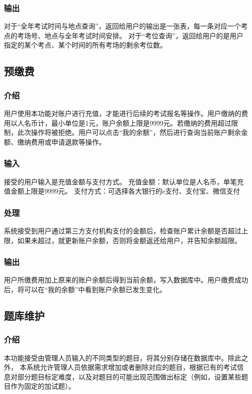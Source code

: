 \subsubsection{输出}
对于“全年考试时间与地点查询”，返回给用户的输出是一张表，每一条对应一个考点的考场号、地点与全年考试时间安排。
对于“考位查询”，返回给用户的是用户指定的某个考点、某个时间的所有考场的剩余考位数。

\subsection{预缴费}

\subsubsection{介绍}
用户使用本功能对账户进行充值，才能进行后续的考试报名等操作。用户缴纳的费用以人名币计，最小单位是1元，账户余额上限是9999元。若缴纳的费用超过限制，此次操作将被拒绝。用户可以点击“我的余额”，然后进行查询当前账户剩余金额、缴纳费用或申请退款等操作。

\subsubsection{输入}
接受的用户输入是充值金额与支付方式。
充值金额：默认单位是人名币，单笔充值金额上限是9999元。
支付方式：可选择各大银行的e支付、支付宝、微信支付

\subsubsection{处理}
系统接受到用户通过第三方支付机构支付的金额后，检查账户累计余额是否超过上限，如果未超过，就更新账户余额，否则将金额返还给用户，并告知余额超限。

\subsubsection{输出}
用户所缴费用加上原来的账户余额后得到当前余额，写入数据库中。用户缴费成功后，将可以在“我的余额”中看到账户余额已发生变化。


\subsection{题库维护}

\subsubsection{介绍}
本功能接受由管理人员输入的不同类型的题目，将其分别存储在数据库中。除此之外， 本系统允许管理人员依据需求增加或者删除对应的题目，根据已有的考试信息对部分题目标定难度，以及对题目的可能出现范围做出标定（例如，设置某些题目作为固定的加试题）。

